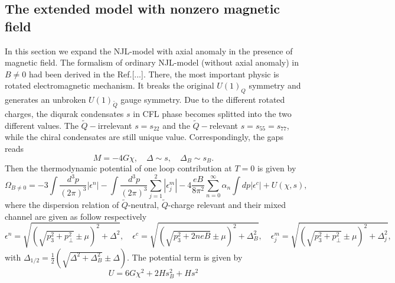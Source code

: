 \documentclass[prd, showpacs,nofootinbib,amsmath,amssymb]{revtex4}
\begin{document}
\subsection{The extended model with nonzero magnetic field}
In this section we expand the NJL-model with axial anomaly in the presence of magnetic field.
The formalism of ordinary NJL-model (without axial anomaly) in $B\neq0$ had been derived in the Ref.[...].
There, the most important physic is rotated electromagnetic mechanism.
It breaks the original $U(1)_{Q}$ symmetry and generates an unbroken $U(1)_{\widetilde{Q}}$ gauge symmetry.
Due to the different rotated charges, the diqurak condensates $s$ in CFL phase becomes splitted into the two different values.
The $\widetilde{Q}-$irrelevant $s=s_{22}$ and the $\widetilde{Q}-$relevant $s=s_{55}=s_{77}$, while the chiral condensates are still unique value.
Correspondingly, the gaps reads
\begin{equation}
M=-4G\chi,\quad
\Delta\sim s,\quad
\Delta_B\sim s_B.
\end{equation}
Then the thermodynamic potential of one loop contribution at $T=0$ is given by
\begin{equation}
\Omega_{B\neq0}=-3\int\frac{d^3p}{(2\pi)^3}|\epsilon^n|
       -\int\frac{d^3p}{(2\pi)^3}\sum^2_{j=1}|\epsilon^m_j|
       -4\frac{eB}{8\pi^2}\sum^\infty_{n=0}\alpha_n\int dp|\epsilon^c|+U(\chi,s),
\end{equation}
where the dispersion relation of $\widetilde{Q}$-neutral, $\widetilde{Q}$-charge relevant and their mixed channel are given as follow respectively
\begin{equation}
\epsilon^{n}=\sqrt{(\sqrt{p^2_3+p^2_{\perp}}\pm\mu)^2+\Delta^2},\quad
\epsilon^c=\sqrt{(\sqrt{p^2_3+2neB}\pm\mu)^2+\Delta^2_B},\quad
\epsilon^{m}_j=\sqrt{(\sqrt{p^2_3+p^2_{\perp}}\pm\mu)^2+\Delta^2_j},
\end{equation}
with $\Delta_{1\slash2}=\frac{1}{2}(\sqrt{\Delta^2+\Delta^2_B}\pm\Delta)$. The potential term is given by
\begin{equation}
U=6G\chi^2+2Hs^2_B+Hs^2
\end{equation}
\end{document}
